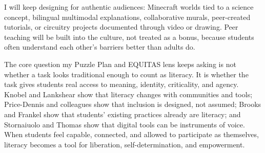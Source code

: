 \documentclass[11pt]{article}
\begin{document}
I will keep designing for authentic audiences: Minecraft worlds tied to a science concept, bilingual multimodal explanations, collaborative murals, peer-created tutorials, or circuitry projects documented through video or drawing. Peer teaching will be built into the culture, not treated as a bonus, because students often understand each other's barriers better than adults do.

The core question my Puzzle Plan and EQUITAS lens keeps asking is not whether a task looks traditional enough to count as literacy. It is whether the task gives students real access to meaning, identity, criticality, and agency. Knobel and Lankshear show that literacy changes with communities and tools; Price-Dennis and colleagues show that inclusion is designed, not assumed; Brooks and Frankel show that students' existing practices already are literacy; and Stornaiuolo and Thomas show that digital tools can be instruments of voice. When students feel capable, connected, and allowed to participate as themselves, literacy becomes a tool for liberation, self-determination, and empowerment.
\end{document}
